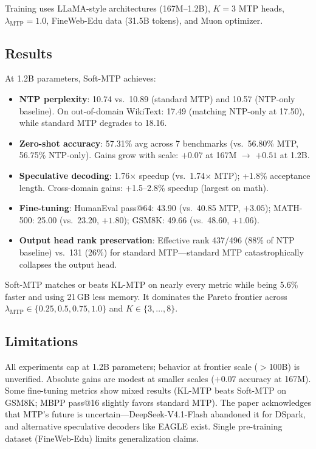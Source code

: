 \documentclass[11pt,a4paper]{article}
\begin{document}
Training uses LLaMA-style architectures (167M--1.2B), $K=3$ MTP heads, $\lambda_{\mathrm{MTP}} = 1.0$, FineWeb-Edu data (31.5B tokens), and Muon optimizer.

\subsection{Results}
At 1.2B parameters, Soft-MTP achieves:

\begin{itemize}
  \item \textbf{NTP perplexity}: 10.74 vs.\ 10.89 (standard MTP) and 10.57 (NTP-only baseline). On out-of-domain WikiText: 17.49 (matching NTP-only at 17.50), while standard MTP degrades to 18.16.
  \item \textbf{Zero-shot accuracy}: 57.31\% avg across 7 benchmarks (vs.\ 56.80\% MTP, 56.75\% NTP-only). Gains grow with scale: $+0.07$ at 167M $\to$ $+0.51$ at 1.2B.
  \item \textbf{Speculative decoding}: 1.76$\times$ speedup (vs.\ 1.74$\times$ MTP); +1.8\% acceptance length. Cross-domain gains: +1.5--2.8\% speedup (largest on math).
  \item \textbf{Fine-tuning}: HumanEval pass@64: 43.90 (vs.\ 40.85 MTP, $+3.05$); MATH-500: 25.00 (vs.\ 23.20, $+1.80$); GSM8K: 49.66 (vs.\ 48.60, $+1.06$).
  \item \textbf{Output head rank preservation}: Effective rank 437/496 (88\% of NTP baseline) vs.\ 131 (26\%) for standard MTP---standard MTP catastrophically collapses the output head.
\end{itemize}

Soft-MTP matches or beats KL-MTP on nearly every metric while being 5.6\% faster and using 21\,GB less memory. It dominates the Pareto frontier across $\lambda_{\mathrm{MTP}} \in \{0.25, 0.5, 0.75, 1.0\}$ and $K \in \{3, \ldots, 8\}$.

\subsection{Limitations}
All experiments cap at 1.2B parameters; behavior at frontier scale ($>$100B) is unverified. Absolute gains are modest at smaller scales ($+0.07$ accuracy at 167M). Some fine-tuning metrics show mixed results (KL-MTP beats Soft-MTP on GSM8K; MBPP pass@16 slightly favors standard MTP). The paper acknowledges that MTP's future is uncertain---DeepSeek-V4.1-Flash abandoned it for DSpark, and alternative speculative decoders like EAGLE exist. Single pre-training dataset (FineWeb-Edu) limits generalization claims.
\end{document}
